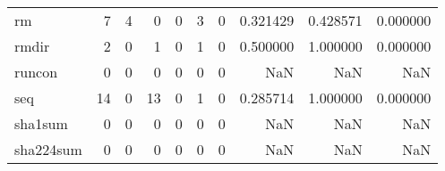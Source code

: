 \begin{tabular}{lrrrrrrrrr}
rm        &                                                  7 &                                                  4 &                                                  0 &                                                  0 &                                                  3 &                                                  0 &                                           0.321429 &                               0.428571 &                             0.000000 \\
rmdir     &                                                  2 &                                                  0 &                                                  1 &                                                  0 &                                                  1 &                                                  0 &                                           0.500000 &                               1.000000 &                             0.000000 \\
runcon    &                                                  0 &                                                  0 &                                                  0 &                                                  0 &                                                  0 &                                                  0 &                                                NaN &                                    NaN &                                  NaN \\
seq       &                                                 14 &                                                  0 &                                                 13 &                                                  0 &                                                  1 &                                                  0 &                                           0.285714 &                               1.000000 &                             0.000000 \\
sha1sum   &                                                  0 &                                                  0 &                                                  0 &                                                  0 &                                                  0 &                                                  0 &                                                NaN &                                    NaN &                                  NaN \\
sha224sum &                                                  0 &                                                  0 &                                                  0 &                                                  0 &                                                  0 &                                                  0 &                                                NaN &                                    NaN &                                  NaN \\

\end{tabular}
